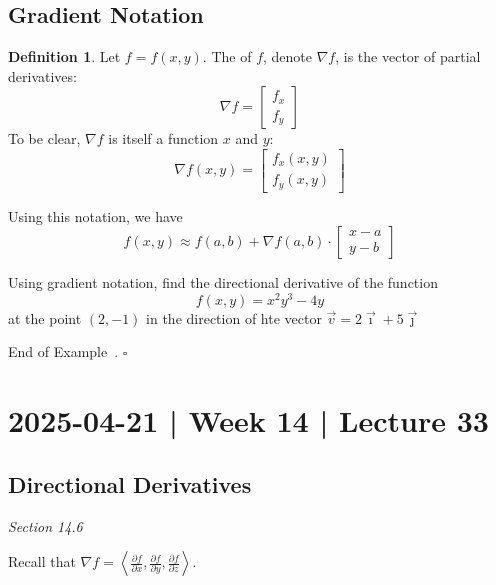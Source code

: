 \documentclass[10pt]{article}
\theoremstyle{definition}
\newtheorem{definition}[theorem]{Definition}
\newtheorem{example}[theorem]{Example}
\renewenvironment{example}
{\begin{oldexample}}
  {\par\smallskip\hfill   End of Example~\theexample. $\square$    \par\end{oldexample}}
\newcommand{\1}[1]{\textbf{1}_{\left[#1\right]}} %
\newcommand{\dempfcolor}[1]{{\color{RoyalBlue}#1}}
\newcommand{\demph}[1]{\dempfcolor{{\sl #1}}}
\begin{document}
\subsection{Gradient Notation}

\begin{definition}
  Let $f=f(x,y)$. The \demph{gradient} of $f$, denote $\nabla f$, is the
  vector of partial derivatives:
  \begin{equation*}
    \nabla f =
    \begin{bmatrix}
      f_{x}\\f_{y}
    \end{bmatrix}
  \end{equation*}
  To be clear, $\nabla f$ is itself a function $x$ and $y$:
  \begin{equation*}
    \nabla f(x,y) =
    \begin{bmatrix}
      f_{x}(x,y)\\f_{y}(x,y)
    \end{bmatrix}
  \end{equation*}
\end{definition}
Using this notation, we have
\begin{equation*}
  f(x,y) \approx f(a,b) + \nabla f(a,b)\cdot
  \begin{bmatrix}
    x-a\\y-b
  \end{bmatrix}
\end{equation*}


\begin{example}
  Using gradient notation, find the directional derivative of the function
  \begin{equation*}
    f(x,y) = x^{2}y^{3}-4y
  \end{equation*}
  at the point $(2,-1)$ in the direction of hte vector $\vec{v} = 2\vec{\imath}+5\vec{\jmath} $
\end{example}
\newpage

\section{2025-04-21 | Week 14 | Lecture 33}


\subsection{Directional Derivatives}
\textit{Section 14.6}

Recall that $\nabla f = \left\langle \frac{\partial f}{\partial
    x},\frac{\partial f}{\partial y}, \frac{\partial f}{\partial z}\right\rangle $.
\end{document}
